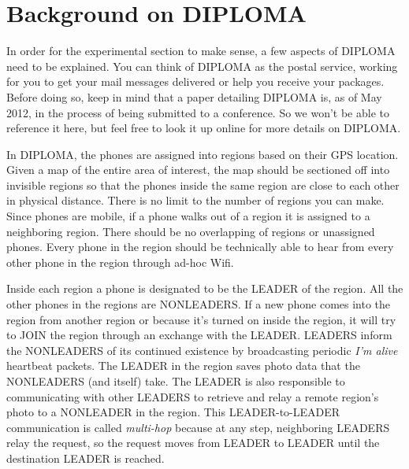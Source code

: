\chapter{Background on DIPLOMA}

In order for the experimental section to make sense, a few aspects of DIPLOMA need to be explained. You can think of DIPLOMA as the postal service, working for you to get your mail messages delivered or help you receive your packages. Before doing so, keep in mind that a paper detailing DIPLOMA is, as of May 2012, in the process of being submitted to a conference. So we won't be able to reference it here, but feel free to look it up online for more details on DIPLOMA.

In DIPLOMA, the phones are assigned into regions based on their GPS location. Given a map of the entire area of interest, the map should be sectioned off into invisible regions so that the phones inside the same region are close to each other in physical distance. There is no limit to the number of regions you can make. Since phones are mobile, if a phone walks out of a region it is assigned to a neighboring region. There should be no overlapping of regions or unassigned phones. Every phone in the region should be technically able to hear from every other phone in the region through ad-hoc Wifi. 

Inside each region a phone is designated to be the LEADER of the region. All the other phones in the regions are NONLEADERS. If a new phone comes into the region from another region or because it's turned on inside the region, it will try to JOIN the region through an exchange with the LEADER. LEADERS inform the NONLEADERS of its continued existence by broadcasting periodic {\it I'm alive} heartbeat packets. The LEADER in the region saves photo data that the NONLEADERS (and itself) take. The LEADER is also responsible to communicating with other LEADERS to retrieve and relay a remote region's photo to a NONLEADER in the region. This LEADER-to-LEADER communication is called {\it multi-hop} because at any step, neighboring LEADERS relay the request, so the request moves from LEADER to LEADER until the destination LEADER is reached.

